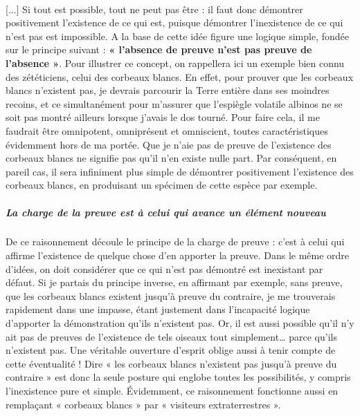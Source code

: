 \documentclass[a4paper,12pt]{article}
\begin{document}
\begin{itemize}
 \paragraph{} 
 [...] Si tout est possible, tout ne peut pas être : il faut donc démontrer positivement l’existence de ce qui est, puisque démontrer l’inexistence de ce qui n’est pas est impossible. A la base de cette idée figure une logique simple, fondée sur le principe suivant : \textbf{« l’absence de preuve n’est pas preuve de l’absence »}. Pour illustrer ce concept, on rappellera ici un exemple bien connu des zététiciens, celui des corbeaux blancs. En effet, pour prouver que les corbeaux blancs n’existent pas, je devrais parcourir la Terre entière dans ses moindres recoins, et ce simultanément pour m’assurer que l’espiègle volatile albinos ne se soit pas montré ailleurs lorsque j’avais le dos tourné. Pour faire cela, il me faudrait être omnipotent, omniprésent et omniscient, toutes caractéristiques évidemment hors de ma portée. Que je n’aie pas de preuve de l’existence des corbeaux blancs ne signifie pas qu’il n’en existe nulle part. Par conséquent, en pareil cas, il sera infiniment plus simple de démontrer positivement l’existence des corbeaux blancs, en produisant un spécimen de cette espèce par exemple.
 \subparagraph{La charge de la preuve est à celui qui avance un élément nouveau}
 De ce raisonnement découle le principe de la charge de preuve : c’est à celui qui affirme l’existence de quelque chose d’en apporter la preuve. Dans le même ordre d’idées, on doit considérer que ce qui n’est pas démontré est inexistant par défaut. Si je partais du principe inverse, en affirmant par exemple, sans preuve, que les corbeaux blancs existent jusqu’à preuve du contraire, je me trouverais rapidement dans une impasse, étant justement dans l’incapacité logique d’apporter la démonstration qu’ils n’existent pas. Or, il est aussi possible qu’il n’y ait pas de preuves de l’existence de tels oiseaux tout simplement… parce qu’ils n’existent pas. Une véritable ouverture d’esprit oblige aussi à tenir compte de cette éventualité ! Dire « les corbeaux blancs n’existent pas jusqu’à preuve du contraire » est donc la seule posture qui englobe toutes les possibilités, y compris l’inexistence pure et simple. Évidemment, ce raisonnement fonctionne aussi en remplaçant « corbeaux blancs » par « visiteurs extraterrestres ». 

\end{itemize}
\end{document}
